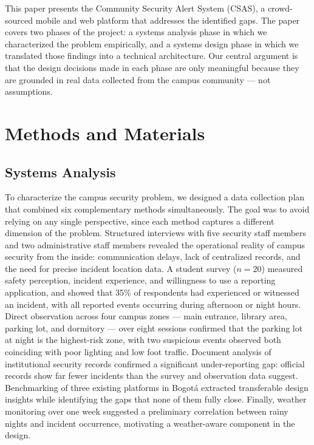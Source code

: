 \documentclass[10pt,twocolumn]{article}
\begin{document}
This paper presents the Community Security Alert System (CSAS), a
crowd-sourced mobile and web platform that addresses the identified gaps. The
paper covers two phases of the project: a systems analysis phase in which we
characterized the problem empirically, and a systems design phase in which we
translated those findings into a technical architecture. Our central argument
is that the design decisions made in each phase are only meaningful because
they are grounded in real data collected from the campus community --- not
assumptions.

\section{Methods and Materials}

\subsection{Systems Analysis}

To characterize the campus security problem, we designed a data collection
plan that combined six complementary methods simultaneously. The goal was
to avoid relying on any single perspective, since each method captures a
different dimension of the problem. Structured interviews with five security
staff members and two administrative staff members revealed the operational
reality of campus security from the inside: communication delays, lack of
centralized records, and the need for precise incident location data. A
student survey ($n=20$) measured safety perception, incident experience, and
willingness to use a reporting application, and showed that 35\% of respondents
had experienced or witnessed an incident, with all reported events occurring
during afternoon or night hours. Direct observation across four campus zones
--- main entrance, library area, parking lot, and dormitory --- over eight
sessions confirmed that the parking lot at night is the highest-risk zone,
with two suspicious events observed both coinciding with poor lighting and low
foot traffic. Document analysis of institutional security records confirmed
a significant under-reporting gap: official records show far fewer incidents
than the survey and observation data suggest. Benchmarking of three existing
platforms in Bogot\'a extracted transferable design insights while identifying
the gaps that none of them fully close. Finally, weather monitoring over one
week suggested a preliminary correlation between rainy nights and incident
occurrence, motivating a weather-aware component in the design.
\end{document}
